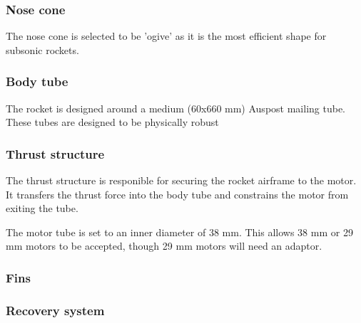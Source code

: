 \documentclass{article}
\begin{document}
\subsubsection{Nose cone}

The nose cone is selected to be 'ogive' as it is the most efficient shape for subsonic rockets.

\subsubsection{Body tube}

The rocket is designed around a medium (60x660 mm) Auspost mailing tube. These tubes are designed to be physically robust

\subsubsection{Thrust structure}



The thrust structure is responible for securing the rocket airframe to the motor. It transfers the thrust force into the body tube and constrains the motor from exiting the tube.

The motor tube is set to an inner diameter of 38 mm. This allows 38 mm or 29 mm motors to be accepted, though 29 mm motors will need an adaptor.

\subsubsection{Fins}


\subsubsection{Recovery system}


\end{document}
